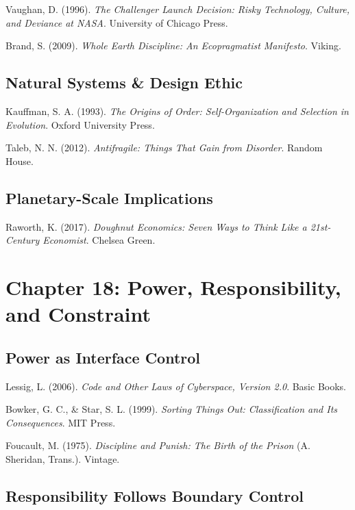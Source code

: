 \documentclass[
  openright]{book}
\begin{document}
Vaughan, D. (1996). \emph{The Challenger Launch Decision: Risky
Technology, Culture, and Deviance at NASA}. University of Chicago Press.

Brand, S. (2009). \emph{Whole Earth Discipline: An Ecopragmatist
Manifesto}. Viking.

\subsection{Natural Systems \& Design
Ethic}\label{natural-systems-design-ethic}

Kauffman, S. A. (1993). \emph{The Origins of Order: Self-Organization
and Selection in Evolution}. Oxford University Press.

Taleb, N. N. (2012). \emph{Antifragile: Things That Gain from Disorder}.
Random House.

\subsection{Planetary-Scale
Implications}\label{planetary-scale-implications}

Raworth, K. (2017). \emph{Doughnut Economics: Seven Ways to Think Like a
21st-Century Economist}. Chelsea Green.

\section{Chapter 18: Power, Responsibility, and
Constraint}\label{chapter-18-power-responsibility-and-constraint}

\subsection{Power as Interface
Control}\label{power-as-interface-control}

Lessig, L. (2006). \emph{Code and Other Laws of Cyberspace, Version
2.0}. Basic Books.

Bowker, G. C., \& Star, S. L. (1999). \emph{Sorting Things Out:
Classification and Its Consequences}. MIT Press.

Foucault, M. (1975). \emph{Discipline and Punish: The Birth of the
Prison} (A. Sheridan, Trans.). Vintage.

\subsection{Responsibility Follows Boundary
Control}\label{responsibility-follows-boundary-control}
\end{document}
